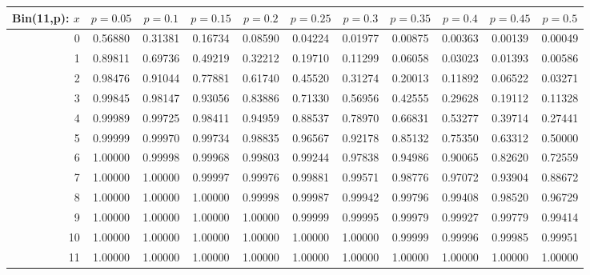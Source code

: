 \vspace{8pt minus 6pt}
\begin{tabular}{@{\extracolsep{-2pt}}|r|c|c|c|c|c|c|c|c|c|c|}
\hline
Bin(11,p): $x$
   & $p\!=\!0.05$& $p\!=\!0.1$& $p\!=\!0.15$& $p\!=\!0.2$& $p\!=\!0.25$& $p\!=\!0.3$& $p\!=\!0.35$& $p\!=\!0.4$& $p\!=\!0.45$& $p\!=\!0.5$\\\hline
  0&0.56880&0.31381&0.16734&0.08590&0.04224&0.01977&0.00875&0.00363&0.00139&0.00049\\
  1&0.89811&0.69736&0.49219&0.32212&0.19710&0.11299&0.06058&0.03023&0.01393&0.00586\\
  2&0.98476&0.91044&0.77881&0.61740&0.45520&0.31274&0.20013&0.11892&0.06522&0.03271\\
  3&0.99845&0.98147&0.93056&0.83886&0.71330&0.56956&0.42555&0.29628&0.19112&0.11328\\
  4&0.99989&0.99725&0.98411&0.94959&0.88537&0.78970&0.66831&0.53277&0.39714&0.27441\\
  5&0.99999&0.99970&0.99734&0.98835&0.96567&0.92178&0.85132&0.75350&0.63312&0.50000\\
  6&1.00000&0.99998&0.99968&0.99803&0.99244&0.97838&0.94986&0.90065&0.82620&0.72559\\
  7&1.00000&1.00000&0.99997&0.99976&0.99881&0.99571&0.98776&0.97072&0.93904&0.88672\\
  8&1.00000&1.00000&1.00000&0.99998&0.99987&0.99942&0.99796&0.99408&0.98520&0.96729\\
  9&1.00000&1.00000&1.00000&1.00000&0.99999&0.99995&0.99979&0.99927&0.99779&0.99414\\
 10&1.00000&1.00000&1.00000&1.00000&1.00000&1.00000&0.99999&0.99996&0.99985&0.99951\\
 11&1.00000&1.00000&1.00000&1.00000&1.00000&1.00000&1.00000&1.00000&1.00000&1.00000\\
\hline
\end{tabular}

